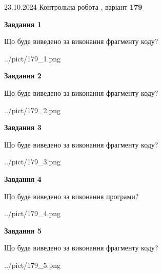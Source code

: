 \documentclass[12pt, ukrainian]{article}
\begin{document}
{\Large{23.10.2024 Контрольна робота , варіант  \No \textbf { 179 }\par}}
{
\begin {large}
{\begin {center}\textbf{Завдання 1}\end {center}}

Що буде виведено за виконання фрагменту коду?\par
\begin{center}
	{../pict/179_1.png}
\end{center}
\newpage

{\begin {center}\textbf{Завдання 2}\end {center}}

Що буде виведено за виконання фрагменту коду?\par
\begin{center}
	{../pict/179_2.png}
\end{center}
\newpage

{\begin {center}\textbf{Завдання 3}\end {center}}

Що буде виведено за виконання фрагменту коду?\par
\begin{center}
	{../pict/179_3.png}
\end{center}
\newpage

{\begin {center}\textbf{Завдання 4}\end {center}}

Що буде виведено за виконання програми?\par
\begin{center}
	{../pict/179_4.png}
\end{center}
\newpage

{\begin {center}\textbf{Завдання 5}\end {center}}

Що буде виведено за виконання фрагменту коду?\par
\begin{center}
	{../pict/179_5.png}
\end{center}
\newpage


\end{large}}
\end{document}
